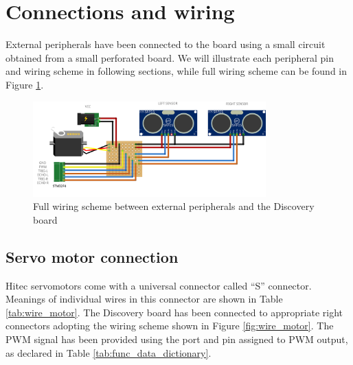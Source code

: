 

\section{Connections and wiring}

External peripherals have been connected to the board using a small circuit obtained from a small perforated board. We will illustrate each peripheral pin and wiring scheme in following sections, while full wiring scheme can be found in Figure \ref{fig:wire_scheme}.

\begin{figure}[htp]
\centering
\includegraphics[width=0.8\textwidth, keepaspectratio]{img/wire-schema.png}
\caption{Full wiring scheme between external peripherals and the Discovery board}
\label{fig:wire_scheme}
\end{figure}



\subsection{Servo motor connection}
Hitec servomotors come with a universal connector called ``S'' connector. Meanings of individual wires in this connector are shown in Table \ref{tab:wire_motor}. The Discovery board has been connected to appropriate right connectors adopting the wiring scheme shown in Figure \ref{fig:wire_motor}. The PWM signal has been provided using the port and pin assigned to PWM output, as declared in Table \ref{tab:func_data_dictionary}.


